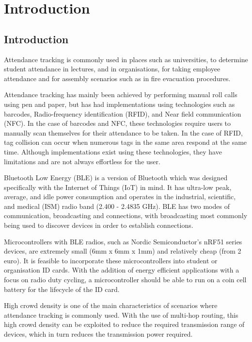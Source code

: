 \chapter{Introduction}

	\section{Introduction}
	Attendance tracking is commonly used in places such as universities, to determine
	student attendance in lectures, and in organisations, for taking employee attendance
	and for assembly scenarios such as in fire evacuation procedures.

	Attendance tracking has mainly been achieved by performing manual roll calls using
	pen and paper, but has had implementations using technologies such as barcodes,
	Radio-frequency identification (RFID), and Near field communication (NFC).
	In the case of barcodes and NFC, these technologies require users to manually
	scan themselves for their attendance to be taken. In the case of RFID, tag collision
	can occur when numerous tags in the same area respond at the same time. Although
	implementations exist using these technologies, they have limitations and are
	not always effortless for the user.

	Bluetooth Low Energy (BLE) is a version of Bluetooth which was designed specifically
	with the Internet of Things (IoT) in mind. It has ultra-low peak, average, and idle
	power consumption and operates in the industrial, scientific, and medical (ISM)
	radio band (2.400 - 2.4835 GHz). BLE has two modes of communication, broadcasting
	and connections, with broadcasting most commonly being used to discover devices in order
	to establish connections.

	Microcontrollers with BLE radios, such as Nordic Semiconductor's nRF51 series
	devices, are extremely small (6mm x 6mm x 1mm) and relatively cheap (from 2 euro).
	It is feasible to incorporate these microcontrollers into student or organisation
	ID cards. With the addition of energy efficient applications with a focus on radio
	duty cycling, a microcontroller should be able to run on a coin cell battery
	for the lifecycle of the ID card.

	High crowd density is one of the main characteristics of scenarios where
	attendance tracking is commonly used. With the use of multi-hop routing,
	this high crowd density can be exploited to reduce the required transmission
	range of devices, which in turn reduces the transmission power required.

